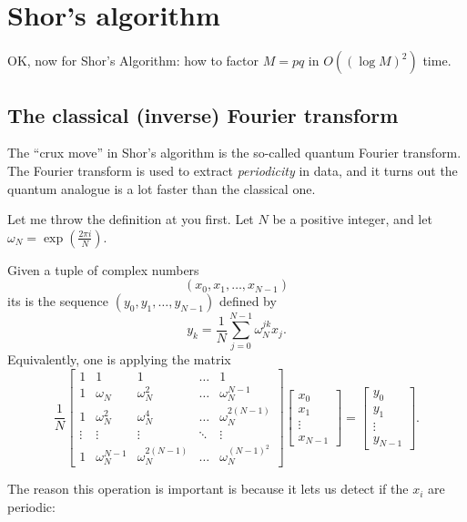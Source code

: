 \chapter{Shor's algorithm}
OK, now for Shor's Algorithm:
how to factor $M = pq$ in $O\left( (\log M)^2 \right)$ time.

\section{The classical (inverse) Fourier transform}
The ``crux move'' in Shor's algorithm is the so-called
quantum Fourier transform.
The Fourier transform is used to extract \emph{periodicity} in data,
and it turns out the quantum analogue is a lot faster than the classical one.

Let me throw the definition at you first.
Let $N$ be a positive integer, and let $\omega_N = \exp\left( \frac{2\pi i}{N} \right)$.
\begin{definition}
	Given a tuple of complex numbers
	\[ \left( x_0, x_1, \dots, x_{N-1} \right) \]
	its  is
	the sequence $(y_0, y_1, \dots, y_{N-1})$ defined by
	\[ y_k = \frac1N \sum_{j=0}^{N-1} \omega_N^{jk} x_j. \]
	Equivalently, one is applying the matrix
	\[
		\frac 1N
		\begin{bmatrix}
			1 & 1 & 1 & \dots & 1 \\
			1 & \omega_N & \omega_N^2 & \dots & \omega_N^{N-1} \\
			1 & \omega_N^2 & \omega_N^4 & \dots & \omega_N^{2(N-1)} \\
			\vdots & \vdots & \vdots & \ddots & \vdots \\
			1 & \omega_N^{N-1} & \omega_N^{2(N-1)} & \dots & \omega_N^{(N-1)^2}
		\end{bmatrix}
		\begin{bmatrix} x_0 \\ x_1 \\ \vdots \\ x_{N-1} \end{bmatrix}
		=
		\begin{bmatrix} y_0 \\ y_1 \\ \vdots \\ y_{N-1} \end{bmatrix}.
	\]
\end{definition}
The reason this operation is important is because it lets
us detect if the $x_i$ are periodic:

